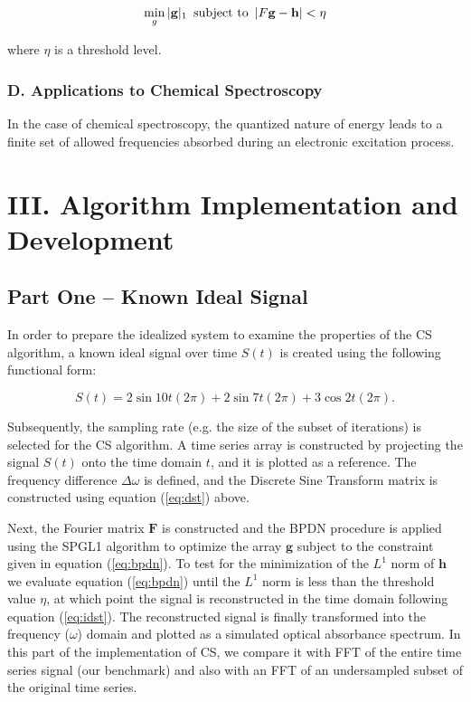 \documentclass[11pt]{article}
\begin{document}
\begin{equation}\label{eq:bpdn}
    \min_{g} |\mathbf{g}|_{1} \text{ \,subject to \,} |F \mathbf{g} - \mathbf{h}| < \eta
\end{equation}

where $\eta$ is a threshold level.
\subsubsection*{D.	Applications to Chemical Spectroscopy}	%

\par In the case of chemical spectroscopy, the quantized nature of energy leads to a finite set of allowed frequencies absorbed during an electronic excitation process. 


\section*{III.	Algorithm Implementation and Development}
\subsection*{Part One -- Known Ideal Signal}
In order to prepare the idealized system to examine the properties of the CS algorithm, a known ideal signal over time $S(t)$ is created using the following functional form:

\begin{equation}\label{eq:ideal}
	S(t) = 2\sin{10t(2\pi)}+2\sin{7t(2\pi)} + 3\cos{2t(2\pi)}.
\end{equation}

\par Subsequently, the sampling rate (e.g. the size of the subset of iterations) is selected for the CS algorithm. A time series array is constructed by projecting the signal $S(t)$ onto the time domain $t$, and it is plotted as a reference.  The frequency difference $\Delta\omega$ is defined, and the Discrete Sine Transform matrix is constructed using equation (\ref{eq:dst}) above.  

\par Next, the Fourier matrix $\mathbf{F}$ is constructed and the BPDN procedure is applied using the SPGL1 algorithm to optimize the array $\mathbf{g}$ subject to the constraint given in equation (\ref{eq:bpdn}). To test for the minimization of the $L^{1}$ norm of $\mathbf{h}$ we evaluate equation (\ref{eq:bpdn}) until the $L^{1}$ norm is less than the threshold value $\eta$, at which point the signal is reconstructed in the time domain following equation (\ref{eq:idst}).  The reconstructed signal is finally transformed into the frequency ($\omega$) domain and plotted as a simulated optical absorbance spectrum. In this part of the implementation of CS, we compare it with FFT of the entire time series signal (our benchmark) and also with an FFT of an undersampled subset of the original time series.  
\end{document}
